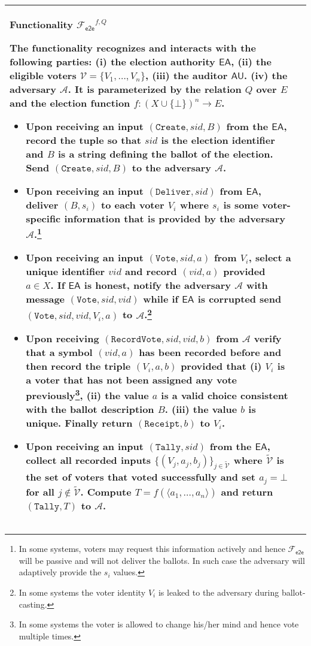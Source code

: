 \documentclass[11pt,letterpaper]{article}
\newenvironment{nffunc}[2][]{
\begin{center}
   \begin{tabular}{|ll|}\hline
     \hspace{.3ex}\begin{minipage}{.99\linewidth}\vspace{0.5ex}
       {\begin{center}{\bf Functionality}
           #2 \end{center}}\vspace{-2ex}%
       }{%
       \vspace{-1ex}
       \smallskip
     \end{minipage}& \\
     \hline
   \end{tabular}
   \end{center}
}
\newcommand{\func}[1][\relax]{\ensuremath{\mathcal{F}_{\mathsf{#1}}}}
\newcommand{\mc}{\mathcal}
\newcommand{\fete}{\func[e2e]}%
\def\EA{\mathsf{EA}}
\def\AU{\mathsf{AU}}
\def\Create{\mathtt{Create}}
\def\Deliver{\mathtt{Deliver}}
\def\Tally{\mathtt{Tally}}
\def\Vote{\mathtt{Vote}}
\def\RecordVote{\mathtt{RecordVote}}
\def\Receipt{\mathtt{Receipt}}
\begin{document}
\begin{nffunc}{$\fete^{f,Q}$}
The functionality recognizes and interacts with the following parties: (i) the election authority $\EA$,
 (ii)  the   eligible voters $\mc{V}= \{V_1,\ldots, V_n\}$, 
 (iii) the auditor $\AU$. 
 (iv) the adversary $\mc{A}$.  It is parameterized by the relation $Q$ over $E$ and
 the election function $f:(X\cup\{\bot\})^n \rightarrow E$.

\begin{itemize}
\item Upon receiving an input $(\Create, sid,  B)$ from the $\EA$, 
record the tuple so that $sid$ is the election identifier and 
$B$ is a string defining the ballot of the election.
Send $(\Create, sid, B)$ to the adversary $\mc{A}$. 

\item Upon receiving an input $(\Deliver, sid)$ from $\EA$,
deliver $(B, s_i)$ to each voter $V_i$ where $s_i$ is some voter-specific
information that is provided by the adversary $\mc{A}$.\footnote{In some systems, 
voters may request this information actively and hence  $\fete$ will be passive 
and will not deliver the ballots.
In such  case the adversary will adaptively provide the $s_i$ values.}

\item Upon receiving an input $(\Vote, sid, a)$ from $V_i$, 
select a unique identifier $vid$ and record $(vid, a)$ provided $a\in X$. 
If $\EA$ is honest,
notify the adversary $\mc{A}$ with message $(\Vote,sid, vid)$ while 
if $\EA$ is corrupted send $(\Vote, sid, vid, V_i, a)$ 
to $\mc{A}$.\footnote{In some systems the voter identity $V_i$ is  leaked to
the adversary during ballot-casting.}

\item 
Upon receiving $(\RecordVote, sid, vid, b)$ from $\mc{A}$ verify that 
a symbol $(vid, a )$ has been recorded before and then
record the triple $(V_i, a, b)$ provided
that  
(i) $V_i$ is a voter that has not been assigned any vote previously\footnote{In some systems
the voter is allowed to change his/her mind and hence vote multiple times.}, 
(ii) the value $a$ is a valid choice consistent with the ballot description $B$.
(iii) the value $b$ is unique. 
Finally return $(\Receipt, b)$ to $V_i$. 

\item Upon receiving an input $(\Tally, sid)$ from the $\EA$, 
collect all recorded inputs  
$\{(V_j, a_j, b_j)\}_{j\in \tilde{\mc{V}}}$ where $\tilde{\mc{V}}$ is the set of voters that voted successfully
and set  $a_j = \bot$ for all $j\not\in \tilde{\mc{V}}$. 
Compute $T =f(\langle a_{1}, \ldots, a_n \rangle )$ and return $(\Tally, T)$ to $\mc{A}$.


\end{itemize}
\end{nffunc}
\end{document}
